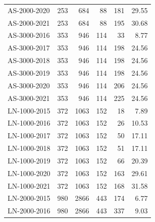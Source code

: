 \begin{table}[h!]
\begin{tabular}{lrrrrr}
		AS-2000-2020                                                                 & 253  & 684  & 88  & 181  & 29.55 \\
		AS-2000-2021                                                                 & 253  & 684  & 88  & 195  & 30.68 \\ \hline
		AS-3000-2016                                                                 & 353  & 946  & 114 & 33   & 8.77  \\
		AS-3000-2017                                                                 & 353  & 946  & 114 & 198  & 24.56 \\
		AS-3000-2018                                                                 & 353  & 946  & 114 & 198  & 24.56 \\
		AS-3000-2019                                                                 & 353  & 946  & 114 & 198  & 24.56 \\
		AS-3000-2020                                                                 & 353  & 946  & 114 & 206  & 24.56 \\
		AS-3000-2021                                                                 & 353  & 946  & 114 & 225  & 24.56 \\ \hline
		LN-1000-2015                                                                 & 372  & 1063 & 152 & 18   & 7.89  \\
		LN-1000-2016                                                                 & 372  & 1063 & 152 & 26   & 10.53 \\
		LN-1000-2017                                                                 & 372  & 1063 & 152 & 50   & 17.11 \\
		LN-1000-2018                                                                 & 372  & 1063 & 152 & 51   & 17.11 \\
		LN-1000-2019                                                                 & 372  & 1063 & 152 & 66   & 20.39 \\
		LN-1000-2020                                                                 & 372  & 1063 & 152 & 163  & 29.61 \\
		LN-1000-2021                                                                 & 372  & 1063 & 152 & 168  & 31.58 \\ \hline
		LN-2000-2015                                                                 & 980  & 2866 & 443 & 174  & 6.77  \\
		LN-2000-2016                                                                 & 980  & 2866 & 443 & 337  & 9.03  \\

\end{tabular}
\end{table}
